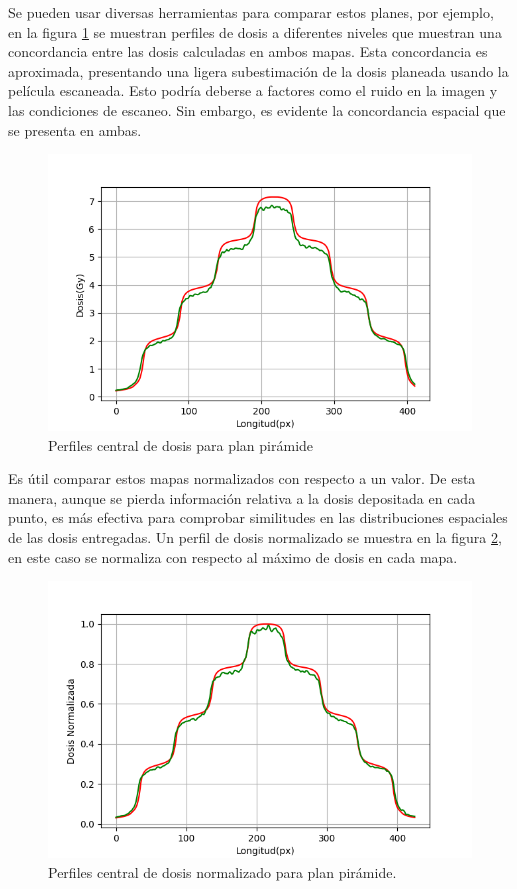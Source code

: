 Se pueden usar diversas herramientas para comparar estos planes, por ejemplo, en la figura \ref{fig:perfilesDosisPiramide} se muestran perfiles de dosis a diferentes niveles que muestran una concordancia entre las dosis calculadas en ambos mapas. Esta concordancia es aproximada, presentando una ligera subestimación de la dosis planeada usando la película escaneada. Esto podría deberse a factores como el ruido en la imagen y las condiciones de escaneo. Sin embargo, es evidente la concordancia espacial que se presenta en ambas.\\
\begin{figure}[H]
	\centering
	\includegraphics[width=0.7\linewidth]{images/perfilCentralPiramide.png}
	
	\caption{Perfiles central de dosis para plan pirámide }
	\label{fig:perfilesDosisPiramide}
\end{figure}
Es útil comparar estos mapas normalizados con respecto a un valor. De esta manera, aunque se pierda información relativa a la dosis depositada en cada punto, es más efectiva para comprobar similitudes en las distribuciones espaciales de las dosis entregadas. Un perfil de dosis normalizado se muestra en la figura \ref{fig:perfilesDosisPiramideNorm}, en este caso se normaliza con respecto al máximo de dosis en cada mapa.\\
\begin{figure}[H]
	\centering
	\includegraphics[width=0.7\linewidth]{images/perfilPiramideNormalizado.png}
	
	\caption{Perfiles central de dosis normalizado para plan pirámide. }
	\label{fig:perfilesDosisPiramideNorm}
\end{figure}

